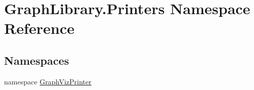 \hypertarget{namespace_graph_library_1_1_printers}{}\section{Graph\+Library.\+Printers Namespace Reference}
\label{namespace_graph_library_1_1_printers}
\subsection*{Namespaces}
\begin{DoxyCompactItemize}
\item 
namespace \hyperlink{namespace_graph_library_1_1_printers_1_1_graph_viz_printer}{Graph\+Viz\+Printer}
\end{DoxyCompactItemize}
